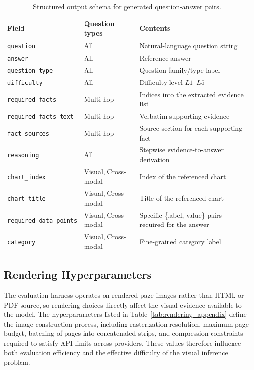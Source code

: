 \documentclass{article} %
\begin{document}
\begin{table}[htbp]
\centering
\small
\caption{Structured output schema for generated question-answer pairs.}
\label{tab:qa_output_appendix}
\begin{tabular}{llp{6.8cm}}
\toprule
\textbf{Field} & \textbf{Question types} & \textbf{Contents} \\
\midrule
\texttt{question}           & All       & Natural-language question string \\
\texttt{answer}             & All       & Reference answer \\
\texttt{question\_type}     & All       & Question family/type label \\
\texttt{difficulty}         & All       & Difficulty level $L1$--$L5$ \\
\texttt{required\_facts}    & Multi-hop & Indices into the extracted evidence list \\
\texttt{required\_facts\_text} & Multi-hop & Verbatim supporting evidence \\
\texttt{fact\_sources}      & Multi-hop & Source section for each supporting fact \\
\texttt{reasoning}          & All       & Stepwise evidence-to-answer derivation \\
\texttt{chart\_index}       & Visual, Cross-modal & Index of the referenced chart \\
\texttt{chart\_title}       & Visual, Cross-modal & Title of the referenced chart \\
\texttt{required\_data\_points} & Visual, Cross-modal & Specific \{label, value\} pairs required for the answer \\
\texttt{category}           & Visual, Cross-modal & Fine-grained category label \\
\bottomrule
\end{tabular}
\end{table}


\subsection{Rendering Hyperparameters}
\label{app:rendering_details}

The evaluation harness operates on rendered page images rather than HTML or PDF source,
so rendering choices directly affect the visual evidence available to the model. The
hyperparameters listed in Table~\ref{tab:rendering_appendix} define the image
construction process, including rasterization resolution, maximum page budget, batching
of pages into concatenated strips, and compression constraints required to satisfy API
limits across providers. These values therefore influence both evaluation efficiency and
the effective difficulty of the visual inference problem.
\end{document}
